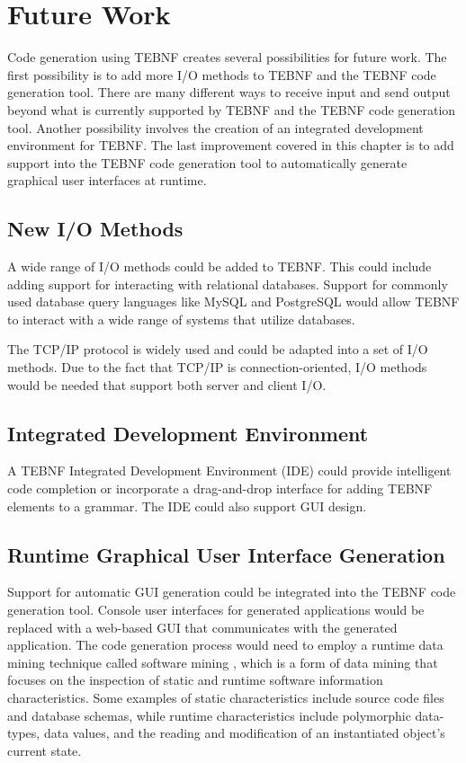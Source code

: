 \chapter{Future Work}
Code generation using TEBNF creates several possibilities for future work.  The first possibility is to add more I/O methods to TEBNF and the TEBNF code generation tool.  There are many different ways to receive input and send output beyond what is currently supported by TEBNF and the TEBNF code generation tool.  Another possibility involves the creation of an integrated development environment for TEBNF.  The last improvement covered in this chapter is to add support into the TEBNF code generation tool to automatically generate graphical user interfaces at runtime.

\section{New I/O Methods}
A wide range of I/O methods could be added to TEBNF.  This could include adding support for interacting with relational databases.  Support for commonly used database query languages like MySQL and PostgreSQL would allow TEBNF to interact with a wide range of systems that utilize databases.

\indent
The TCP/IP protocol is widely used and could be adapted into a set of I/O methods.  Due to the fact that TCP/IP is connection-oriented, I/O methods would be needed that support both server and client I/O.

\section{Integrated Development Environment}
A TEBNF Integrated Development Environment (IDE) could provide intelligent code completion or incorporate a drag-and-drop interface for adding TEBNF elements to a grammar.  The IDE could also support GUI design.

\section{Runtime Graphical User Interface Generation}
Support for automatic GUI generation could be integrated into the TEBNF code generation tool.  Console user interfaces for generated applications would be replaced with a web-based GUI that communicates with the generated application.  The code generation process would need to employ a runtime data mining technique called software mining \cite{kennard_01,kennard_02}, which is a form of data mining that focuses on the inspection of static and runtime software information characteristics.  Some examples of static characteristics include source code files and database schemas, while runtime characteristics include polymorphic data-types, data values, and the reading and modification of an instantiated object’s current state.

